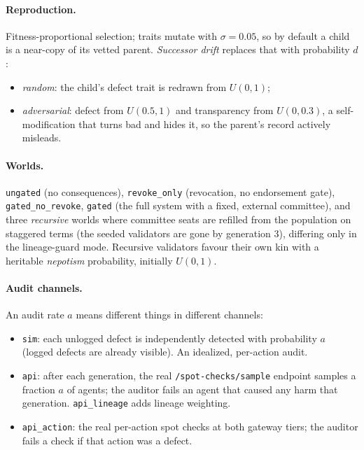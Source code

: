 \documentclass[11pt]{article}
\newcommand{\code}[1]{\texttt{#1}}
\begin{document}
\paragraph{Reproduction.} Fitness-proportional selection; traits mutate with
$\sigma = 0.05$, so by default a child is a near-copy of its vetted parent.
\emph{Successor drift} replaces that with probability $d$:
\begin{itemize}
  \item \emph{random}: the child's defect trait is redrawn from $U(0,1)$;
  \item \emph{adversarial}: defect from $U(0.5,1)$ and transparency from $U(0,0.3)$, a
  self-modification that turns bad and hides it, so the parent's record actively misleads.
\end{itemize}

\paragraph{Worlds.} \code{ungated} (no consequences), \code{revoke\_only} (revocation, no
endorsement gate), \code{gated\_no\_revoke}, \code{gated} (the full system with a fixed,
external committee), and three \emph{recursive} worlds where committee seats are refilled
from the population on staggered terms (the seeded validators are gone by generation 3),
differing only in the lineage-guard mode. Recursive validators favour their own kin with a
heritable \emph{nepotism} probability, initially $U(0,1)$.

\paragraph{Audit channels.} An audit rate $a$ means different things in different channels:
\begin{itemize}
  \item \code{sim}: each unlogged defect is independently detected with probability $a$
  (logged defects are already visible). An idealized, per-action audit.
  \item \code{api}: after each generation, the real \code{/spot-checks/sample} endpoint
  samples a fraction $a$ of agents; the auditor fails an agent that caused any harm that
  generation. \code{api\_lineage} adds lineage weighting.
  \item \code{api\_action}: the real per-action spot checks at both gateway tiers; the
  auditor fails a check if that action was a defect.
\end{itemize}
\end{document}
